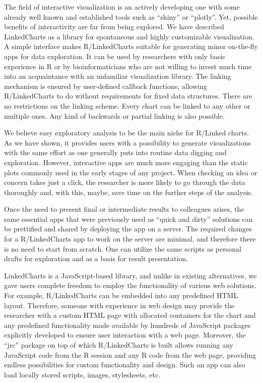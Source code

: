 \documentclass[twocolumn,10pt]{article}
\begin{document}
The field of interactive visualization is an actively developing one with some already well known and established tools such as ``shiny'' \citep{shiny} or ``plotly''\citep{sievert_2020}. Yet, possible benefits of interactivity are far from being explored. We have described LinkedCharts as a library for spontaneous and highly customizable visualization. A simple interface makes R/LinkedCharts suitable for generating minor on-the-fly apps for data exploration. It can be used by researchers with only basic experience in R or by bioinformaticians who are not willing to invest much time into an acquaintance with an unfamiliar visualization library. The linking mechanism is ensured by user-defined callback functions, allowing R/LinkedCharts to do without requirements for fixed data structures. There are no restrictions on the linking scheme. Every chart can be linked to any other or multiple ones. Any kind of backwards or partial linking is also possible.

We believe easy exploratory analysis to be the main niche for R/Linked charts. As we have shown, it provides users with a possibility to generate visualizations with the same effort as one generally puts into routine data digging and exploration. However, interactive apps are much more engaging than the static plots commonly used in the early stages of any project. When checking an idea or concern takes just a click, the researcher is more likely to go through the data thoroughly and, with this, maybe, save time on the further steps of the analysis.

Once the need to present final or intermediate results to colleagues arises, the same essential apps that were previously used as ``quick and dirty'' solutions can be prettified and shared by deploying the app on a server. The required changes for a R/LinkedCharts app to work on the server are minimal, and therefore there is no need to start from scratch. One can utilize the same scripts as personal drafts for exploration and as a basis for result presentation.

LinkedCharts is a JavaScript-based library, and unlike in existing alternatives, we gave users complete freedom to employ the functionality of various web solutions. For example, R/LinkedCharts can be embedded into any predefined HTML layout. Therefore, someone with experience in web design may provide the researcher with a custom HTML page with allocated containers for the chart and any predefined functionality made available by hundreds of JavaScript packages explicitly developed to ensure user interaction with a web page. Moreover, the ``jrc'' package on top of which R/LinkedCharts is built allows running any JavaScript code from the R session and any R code from the web page, providing endless possibilities for custom functionality and design. Such an app can also load locally stored scripts, images, stylesheets, etc.
\end{document}
